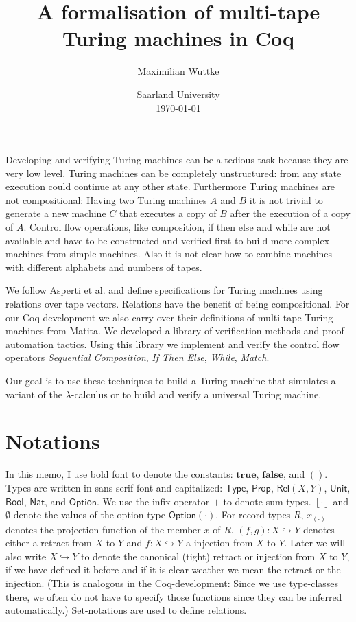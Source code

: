 \documentclass{psartcl}
\newcommand{\MS}[1]{\textsf{#1}}
\newcommand{\from}{:}
\newcommand{\Option}{\MS{Option}}
\newcommand{\Bool}{\MS{Bool}}
\newcommand{\Nat}{\MS{Nat}}
\newcommand{\Prop}{\MS{Prop}}
\newcommand{\Type}{\MS{Type}}
\newcommand{\Unit}{\MS{Unit}}
\newcommand{\Some}[1]{\left\lfloor #1\right\rfloor}
\renewcommand{\None}{\emptyset}
\newcommand{\true}{\mathbf{true}}
\newcommand{\false}{\mathbf{false}}
\newcommand{\unit}{\mathbf{()}}
\newcommand{\Rel}{\mathsf{Rel}}
\begin{document}
\title{A formalisation of multi-tape \\ Turing machines in Coq}
\author{Maximilian Wuttke}
\date{Saarland University\\\today}
\maketitle

\begin{abstract}
  \noindent
\end{abstract}
Developing and verifying Turing machines can be a tedious task because they are very low level.  Turing machines can be completely unstructured: from
any state execution could continue at any other state.  Furthermore Turing machines are not compositional:  Having two Turing machines $A$ and $B$ it
is not trivial to generate a new machine $C$ that executes a copy of $B$ after the execution of a copy of $A$.  Control flow operations, like
composition, if then else and while are not available and have to be constructed and verified first to build more complex machines from simple
machines.  Also it is not clear how to combine machines with different alphabets and numbers of tapes.

We follow Asperti et al. and define specifications for Turing machines using relations over tape vectors.  Relations have the benefit of being
compositional.  For our Coq development we also carry over their definitions of multi-tape Turing machines from Matita.  We developed a library of
verification methods and proof automation tactics.  Using this library we implement and verify the control flow operators \emph{Sequential
Composition}, \emph{If Then Else}, \emph{While}, \emph{Match}.

Our goal is to use these techniques to build a Turing machine that simulates a variant of the $\lambda$-calculus or to build and verify a universal
Turing machine.

\section{Notations}
In this memo, I use bold font to denote the constants: $\true$, $\false$, and $\unit$.  Types are written in sans-serif font and capitalized: $\Type$,
$\Prop$, $\Rel(X, Y)$, $\Unit$, $\Bool$, $\Nat$, and $\Option$.  We use the infix operator $+$ to denote sum-types.  $\Some{\cdot}$ and $\None$ denote
the values of the option type $\Option(\cdot)$.  For record types $R$, $x_{(\cdot)}$ denotes the projection function of the member $x$ of $R$.
$(f, g) \from X \hookrightarrow Y$ denotes either a retract from $X$ to $Y$ and $f \from X \hookrightarrow Y$ a injection from $X$ to $Y$.
Later we will also write $X \hookrightarrow Y$ to denote the canonical (tight) retract or injection from $X$ to $Y$, if we have defined it before and
if it is clear weather we mean the retract or the injection.  (This is analogous in the Coq-development:  Since we use type-classes there, we often
do not have to specify those functions since they can be inferred automatically.)  Set-notations are used to define relations.
\end{document}

